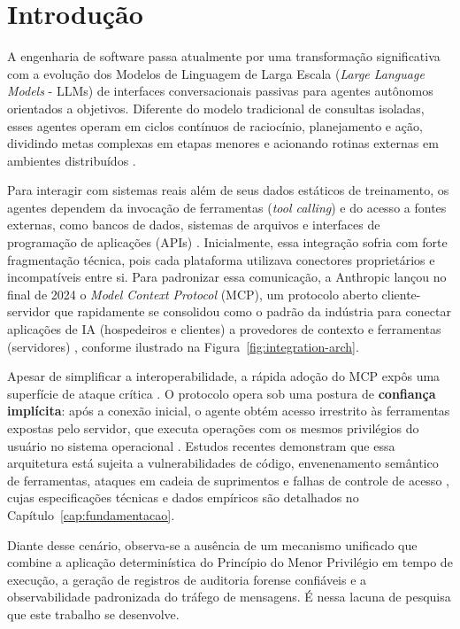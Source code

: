 \chapter{Introdução}
\label{cap:introducao}

A engenharia de software passa atualmente por uma transformação significativa com a evolução dos Modelos de Linguagem de Larga Escala (\textit{Large Language Models} - LLMs) de interfaces conversacionais passivas para agentes autônomos orientados a objetivos. Diferente do modelo tradicional de consultas isoladas, esses agentes operam em ciclos contínuos de raciocínio, planejamento e ação, dividindo metas complexas em etapas menores e acionando rotinas externas em ambientes distribuídos \cite{buhler2026agentbound,singh2026mcpsecure}.

Para interagir com sistemas reais além de seus dados estáticos de treinamento, os agentes dependem da invocação de ferramentas (\textit{tool calling}) e do acesso a fontes externas, como bancos de dados, sistemas de arquivos e interfaces de programação de aplicações (APIs) \cite{hou2025mcp,hasan2026mcp}. Inicialmente, essa integração sofria com forte fragmentação técnica, pois cada plataforma utilizava conectores proprietários e incompatíveis entre si. Para padronizar essa comunicação, a Anthropic lançou no final de 2024 o \textit{Model Context Protocol} (MCP), um protocolo aberto cliente-servidor que rapidamente se consolidou como o padrão da indústria para conectar aplicações de IA (hospedeiros e clientes) a provedores de contexto e ferramentas (servidores) \cite{hou2025mcp,guo2025measurement}, conforme ilustrado na Figura~\ref{fig:integration-arch}.

Apesar de simplificar a interoperabilidade, a rápida adoção do MCP expôs uma superfície de ataque crítica \cite{guo2025measurement,hou2025mcp}. O protocolo opera sob uma postura de \textbf{confiança implícita}: após a conexão inicial, o agente obtém acesso irrestrito às ferramentas expostas pelo servidor, que executa operações com os mesmos privilégios do usuário no sistema operacional \cite{buhler2026agentbound,singh2026mcpsecure}. Estudos recentes demonstram que essa arquitetura está sujeita a vulnerabilidades de código, envenenamento semântico de ferramentas, ataques em cadeia de suprimentos e falhas de controle de acesso \cite{hasan2026mcp,jang2026hierarchical,zhang2025acfix}, cujas especificações técnicas e dados empíricos são detalhados no Capítulo~\ref{cap:fundamentacao}.

Diante desse cenário, observa-se a ausência de um mecanismo unificado que combine a aplicação determinística do Princípio do Menor Privilégio em tempo de execução, a geração de registros de auditoria forense confiáveis e a observabilidade padronizada do tráfego de mensagens. É nessa lacuna de pesquisa que este trabalho se desenvolve.


